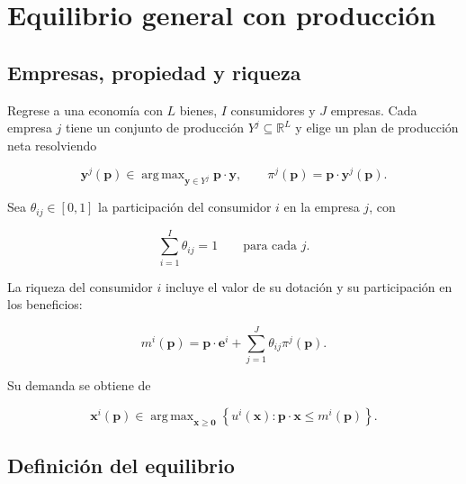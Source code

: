 \documentclass[12pt]{article}
\theoremstyle{cideplain}
\theoremstyle{cidedef}
\DeclareMathOperator*{\argmax}{arg\,max}
\newcommand{\R}{\mathbb{R}}
\newcommand{\p}{\mathbf{p}}
\newcommand{\e}{\bm e}
\newcommand{\x}{\mathbf{x}}
\newcommand{\y}{\mathbf{y}}
\begin{document}
\section{Equilibrio general con producción}

\subsection{Empresas, propiedad y riqueza}

Regrese a una economía con \(L\) bienes, \(I\) consumidores y \(J\) empresas. Cada
empresa \(j\) tiene un conjunto de producción \(Y^j\subseteq\R^L\) y elige un plan de
producción neta resolviendo

\begin{equation}
  \y^{j}(\p)
  \in\argmax_{\y\in Y^j}\p\cdot\y,
  \qquad
  \pi^j(\p)=\p\cdot\y^j(\p).
  \label{eq:profit-general}
\end{equation}

Sea \(\theta_{ij}\in[0,1]\) la participación del consumidor \(i\) en la empresa \(j\), con

\[
  \sum_{i=1}^I\theta_{ij}=1
  \qquad\text{para cada }j.
\]

La riqueza del consumidor \(i\) incluye el valor de su dotación y su participación en los
beneficios:

\begin{equation}
  m^i(\p)
  =\p\cdot\e^i
  +\sum_{j=1}^J\theta_{ij}\pi^j(\p).
  \label{eq:wealth-production}
\end{equation}

Su demanda se obtiene de

\begin{equation}
  \x^i(\p)
  \in\argmax_{\x\geq\bm 0}
  \left\{u^i(\x):\p\cdot\x\leq m^i(\p)\right\}.
  \label{eq:consumer-production}
\end{equation}

\subsection{Definición del equilibrio}
\end{document}
